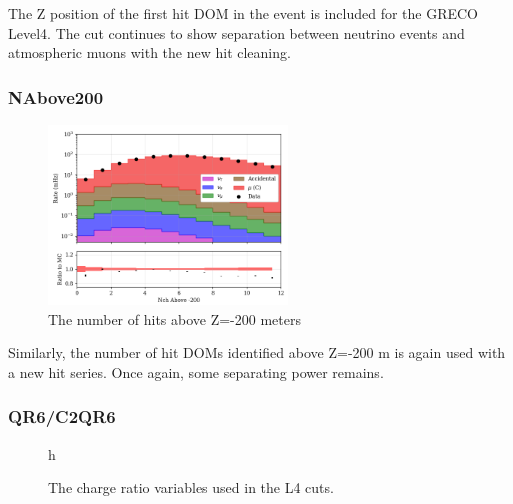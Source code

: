 The Z position of the first hit DOM in the event is included for the GRECO Level4. 
The cut continues to show separation between neutrino events and atmospheric muons with the new hit cleaning.

\subsubsection{NAbove200}
\begin{figure}[h]
	\centering
		\includegraphics[width=2.5in]{NAbove200_log.png}
		\caption[Number of Hits Above Z=-200]{The number of hits above Z=-200 meters}
	\label{fig:nabove200_log}
\end{figure}

Similarly, the number of hit DOMs identified above Z=-200 m is again used with a new hit series.
Once again, some separating power remains.

\subsubsection{QR6/C2QR6}
\begin{figure}{h}%
	\centering
	\caption[QR6 and C2QR6]{The charge ratio variables used in the L4 cuts.}%
	\label{fig:QR6_and_C2QR6}%
\end{figure}

